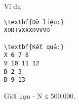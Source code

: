 Ví dụ  
\begin{verbatim}
\textbf{Dữ liệu:}
XDDTVXXXDVVVD

\textbf{Kết quả:}
X 6 7 8
V 10 11 12
D 2 3
D 9 13
\end{verbatim}
   Giới hạn  
- N ≤ 500,000.
